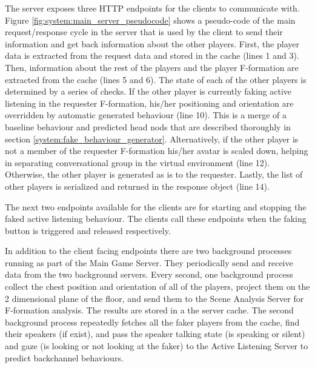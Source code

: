 \documentclass[]{simple-thesis}
\begin{document}
The server exposes three HTTP endpoints for the clients to communicate with.
Figure \ref{fig:system:main_server_pseudocode} shows a pseudo-code of the main request/response cycle in the server that is used by the client to send their information and get back information about the other players.
First, the player data is extracted from the request data and stored in the cache (lines 1 and 3).
Then, information about the rest of the players and the player F-formation are extracted from the cache (lines 5 and 6).
The state of each of the other players is determined by a series of checks.
If the other player is currently faking active listening in the requester F-formation, his/her positioning and orientation are overridden by automatic generated behaviour (line 10).
This is a merge of a baseline behaviour and predicted head nods that are described thoroughly in section \ref{system:fake_behaviour_generator}.
Alternatively, if the other player is not a member of the requester F-formation his/her avatar is scaled down, helping in separating conversational group in the virtual environment (line 12).
Otherwise, the other player is generated as is to the requester.
Lastly, the list of other players is serialized and returned in the response object (line 14).

The next two endpoints available for the clients are for starting and stopping the faked active listening behaviour.
The clients call these endpoints when the faking button is triggered and released respectively.

In addition to the client facing endpoints there are two background processes running as part of the Main Game Server.
They periodically send and receive data from the two background servers.
Every second, one background process collect the chest position and orientation of all of the players, project them on the 2 dimensional plane of the floor, and send them to the Scene Analysis Server for F-formation analysis.
The results are stored in a the server cache.
The second background process repeatedly fetches all the faker players from the cache, find their speakers (if exist), and pass the speaker talking state (is speaking or silent) and gaze (is looking or not looking at the faker) to the Active Listening Server to predict backchannel behaviours.
\end{document}
